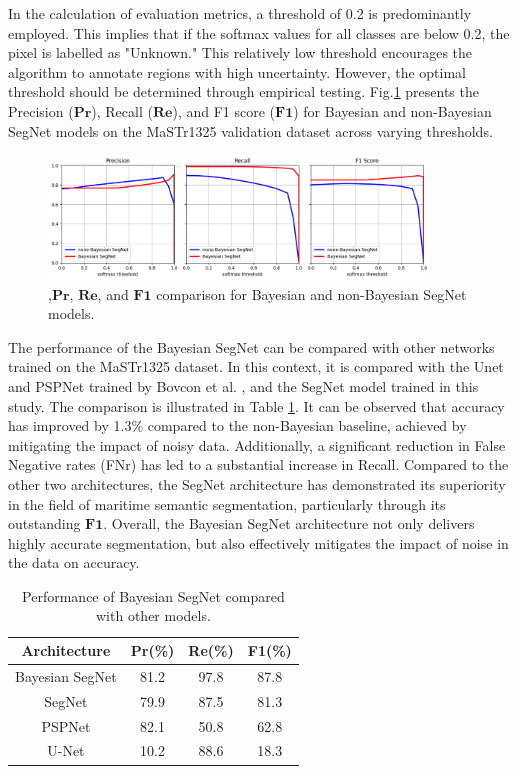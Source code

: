 In the calculation of evaluation metrics, a threshold of 0.2 is predominantly employed. This implies that if the 
softmax values for all classes are below 0.2, the pixel is labelled as "Unknown." This relatively low threshold 
encourages the algorithm to annotate regions with high uncertainty. However, the optimal threshold should be 
determined through empirical testing. Fig.\ref{fig:eval-threshold} presents the Precision ($\mathbf{Pr}$), 
Recall ($\mathbf{Re}$), and F1 score ($\mathbf{F1}$) for Bayesian and non-Bayesian SegNet models on the MaSTr1325 
validation dataset across varying thresholds.
\begin{figure}[ht!]
    \centering
    \includegraphics[width=0.9\textwidth]{figures/MaSTr1325/evaluation-threshold.png}
    \caption{,$\mathbf{Pr}$, $\mathbf{Re}$, and $\mathbf{F1}$ comparison for Bayesian and non-Bayesian SegNet models.}
    \label{fig:eval-threshold}
\end{figure}

The performance of the Bayesian SegNet can be compared with other networks trained on the MaSTr1325 dataset. In 
this context, it is compared with the Unet and PSPNet trained by Bovcon et al. \cite{MaSTr1325}, and the SegNet 
model trained in this study. The comparison is illustrated in Table \ref{tab:BS-vs-others}. It can be observed 
that accuracy has improved by 1.3\% compared to the non-Bayesian baseline, achieved by mitigating the impact of 
noisy data. Additionally, a significant reduction in False Negative rates (FNr) has led to a substantial increase 
in Recall. Compared to the other two architectures, the SegNet architecture has demonstrated its superiority in the 
field of maritime semantic segmentation, particularly through its outstanding $\mathbf{F1}$. Overall, the Bayesian 
SegNet architecture not only delivers highly accurate segmentation, but also effectively mitigates the impact of noise 
in the data on accuracy.
\begin{table}[ht!]
    \centering
    \caption{Performance of Bayesian SegNet compared with other models.}
    \label{tab:BS-vs-others}
    \begin{tabular}{c|c|c|c}
    \textbf{Architecture}        & \textbf{Pr}(\%) & \textbf{Re}(\%) & \textbf{F1}(\%) \\ \hline
    Bayesian SegNet              & 81.2 & 97.8 & 87.8 \\ \hline 
    SegNet                       & 79.9 & 87.5 & 81.3 \\ \hline 
    PSPNet\cite{PSPNet}          & 82.1 & 50.8 & 62.8 \\ \hline
    U-Net\cite{UNet}             & 10.2 & 88.6 & 18.3 \\ \hline
    \end{tabular}
\end{table}

